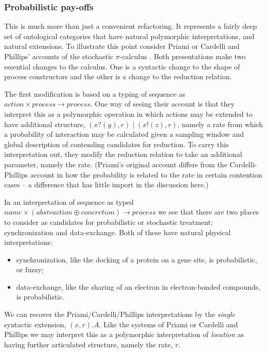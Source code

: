 \subsubsection{Probabilistic pay-offs}
This is much more than just a convenient refactoring. It represents a
fairly deep set of ontological categories that have natural
polymorphic interpretations, and natural extensions. To illustrate
this point consider Priami or Cardelli and Phillips' accounts of the
stochastic $\pi$-calculus \cite{DBLP:journals/cj/Priami95}
\cite{Phillips-Cardelli-Bioconcur04}. Both presentations make two
essential changes to the calculus. One is a syntactic change to the
shape of process constructors and the other is a change to the
reduction relation.

The first modification is based on a typing of sequence as $action
\times process \to process$. One way of seeing their account is that
they interpret this as a polymorphic operation in which actions may be
extended to have additional structure, $(x?(y),r) \; | \; (x!(z),r)$,
namely a rate from which a probability of interaction may be
calculated given a sampling window and global description of
contending candidates for reduction. To carry this interpretation out,
they modify the reduction relation to take an additional parameter,
namely the rate. (Priami's original account differs from the
Cardelli-Phillips account in how the probability is related to the
rate in certain contention cases -- a difference that has little
import in the discussion here.)

In an interpretation of sequence as typed $name \times (abstraction
\oplus concretion) \to process$ we see that there are two places to
consider as candidates for probabilistic or stochastic treatment:
synchronization and data-exchange. Both of these have natural physical
interpretations:

\begin{itemize} 
\item synchronization, like the docking of a protein on a gene site,
  is probabilistic, or fuzzy;
\item data-exchange, like the sharing of an electron in
  electron-bonded compounds, is probabilistic.
\end{itemize}

We can recover the Priami/Cardelli/Phillips interpretations by the
\emph{single} syntactic extension, $(x,r).A$. Like the systems of
Priami or Cardelli and Phillips we may interpret this as a polymorphic
interpretation of \emph{location} as having further articulated
structure, namely the rate, $r$. 

